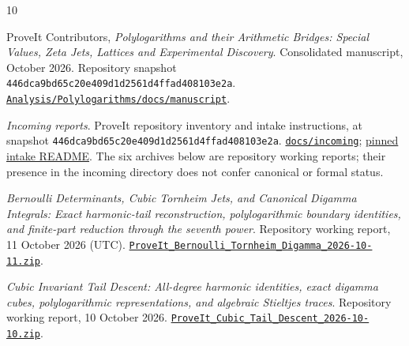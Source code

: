 \documentclass[11pt,letterpaper]{article}
\numberwithin{equation}{section}
\theoremstyle{plain}
\theoremstyle{definition}
\theoremstyle{remark}
\begin{document}

\begin{thebibliography}{10}
\raggedright

ProveIt Contributors,
\emph{Polylogarithms and their Arithmetic Bridges:
Special Values, Zeta Jets, Lattices and Experimental Discovery}.
Consolidated manuscript, October 2026.
Repository snapshot
\texttt{446dca9bd65c20e409d1d2561d4ffad408103e2a}.
\href{https://github.com/VladimirReshetnikov/ProveIt/tree/446dca9bd65c20e409d1d2561d4ffad408103e2a/Analysis/Polylogarithms/docs/manuscript}
{\nolinkurl{Analysis/Polylogarithms/docs/manuscript}}.

\emph{Incoming reports}.
ProveIt repository inventory and intake instructions, at snapshot
\texttt{446dca9bd65c20e409d1d2561d4ffad408103e2a}.
\href{https://github.com/VladimirReshetnikov/ProveIt/tree/446dca9bd65c20e409d1d2561d4ffad408103e2a/docs/incoming}
{\nolinkurl{docs/incoming}};
\href{https://raw.githubusercontent.com/VladimirReshetnikov/ProveIt/446dca9bd65c20e409d1d2561d4ffad408103e2a/docs/incoming/README.md}
{pinned intake README}.
The six archives below are repository working reports; their presence
in the incoming directory does not confer canonical or formal status.

\emph{Bernoulli Determinants, Cubic Tornheim Jets, and Canonical Digamma
Integrals: Exact harmonic-tail reconstruction, polylogarithmic boundary
identities, and finite-part reduction through the seventh power}.
Repository working report, 11 October 2026 (UTC).
\href{https://raw.githubusercontent.com/VladimirReshetnikov/ProveIt/446dca9bd65c20e409d1d2561d4ffad408103e2a/docs/incoming/ProveIt_Bernoulli_Tornheim_Digamma_2026-10-11.zip}
{\nolinkurl{ProveIt_Bernoulli_Tornheim_Digamma_2026-10-11.zip}}.

\emph{Cubic Invariant Tail Descent: All-degree harmonic identities,
exact digamma cubes, polylogarithmic representations, and algebraic
Stieltjes traces}.
Repository working report, 10 October 2026.
\href{https://raw.githubusercontent.com/VladimirReshetnikov/ProveIt/446dca9bd65c20e409d1d2561d4ffad408103e2a/docs/incoming/ProveIt_Cubic_Tail_Descent_2026-10-10.zip}
{\nolinkurl{ProveIt_Cubic_Tail_Descent_2026-10-10.zip}}.


\end{thebibliography}
\end{document}
